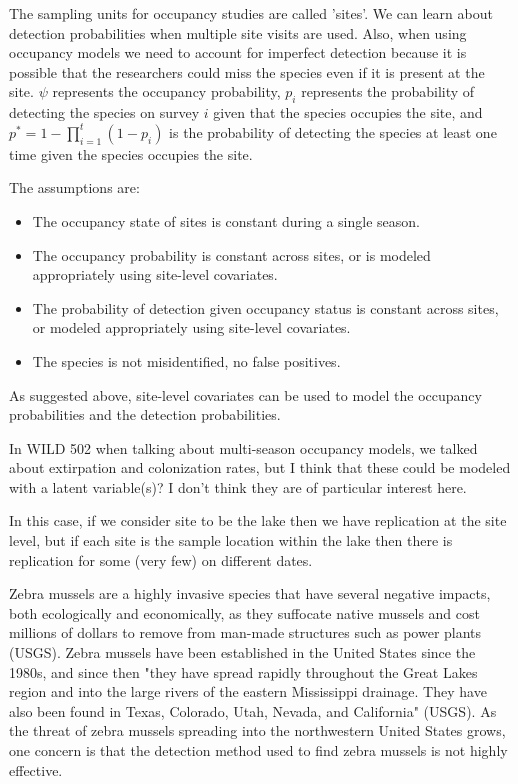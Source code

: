 \documentclass[12pt]{article}\usepackage[]{graphicx}\usepackage[]{color}
\begin{document}
The sampling units for occupancy studies are called 'sites'. We can learn about detection probabilities when multiple site visits are used. Also, when using occupancy models we need to account for imperfect detection because it is possible that the researchers could miss the species even if it is present at the site. $\psi$ represents the occupancy probability, $p_i$ represents the probability of detecting the species on survey $i$ given that the species occupies the site, and $p^* = 1- \prod_{i = 1}^{t} (1-p_i)$ is the probability of detecting the species at least one time given the species occupies the site. 

The assumptions are: 
\begin{itemize}
\item The occupancy state of sites is constant during a single season. 
\item The occupancy probability is constant across sites, or is modeled appropriately using site-level covariates. 
\item The probability of detection given occupancy status is constant across sites, or modeled appropriately using site-level covariates. 
\item The species is not misidentified, no false positives. 
\end{itemize}

As suggested above, site-level covariates can be used to model the occupancy probabilities and the detection probabilities. 

In WILD 502 when talking about multi-season occupancy models, we talked about extirpation and colonization rates, but I think that these could be modeled with a latent variable(s)? I don't think they are of particular interest here. 

In this case, if we consider site to be the lake then we have replication at the site level, but if each site is the sample location within the lake then there is replication for some (very few) on different dates. 


Zebra mussels are a highly invasive species that have several negative impacts, both ecologically and economically, as they suffocate native mussels and cost millions of dollars to remove from man-made structures such as power plants (USGS). Zebra mussels have been established in the United States since the 1980s, and since then "they have spread rapidly throughout the Great Lakes region and into the large rivers of the eastern Mississippi drainage. They have also been found in Texas, Colorado, Utah, Nevada, and California" (USGS). As the threat of zebra mussels spreading into the northwestern United States grows, one concern is that the detection method used to find zebra mussels is not highly effective.
\end{document}
